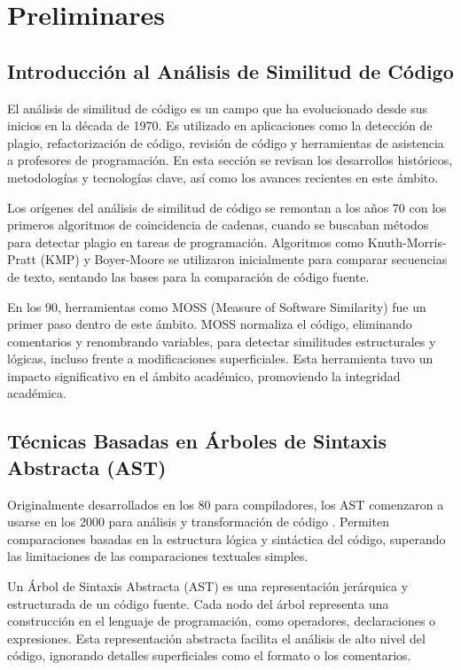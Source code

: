 \chapter{Preliminares}\label{chapter:state-of-the-art}

\section{Introducción al Análisis de Similitud de Código}
El análisis de similitud de código es un campo que ha evolucionado desde sus inicios en la década de 1970. Es utilizado en aplicaciones como la detección de plagio, refactorización de código, revisión de código y herramientas de asistencia a profesores de programación. En esta sección se revisan los desarrollos históricos, metodologías y tecnologías clave, así como los avances recientes en este ámbito.

Los orígenes del análisis de similitud de código se remontan a los años 70 con los primeros algoritmos de coincidencia de cadenas, cuando se buscaban métodos para detectar plagio en tareas de programación. Algoritmos como Knuth-Morris-Pratt (KMP) \cite{knuth1977fast} y Boyer-Moore \cite{boyer1977fast} se utilizaron inicialmente para comparar secuencias de texto, sentando las bases para la comparación de código fuente.

En los 90, herramientas como MOSS (Measure of Software Similarity) \cite{aiken1994moss} fue un primer paso dentro de este ámbito. MOSS normaliza el código, eliminando comentarios y renombrando variables, para detectar similitudes estructurales y lógicas, incluso frente a modificaciones superficiales. Esta herramienta tuvo un impacto significativo en el ámbito académico, promoviendo la integridad académica.

\section{Técnicas Basadas en Árboles de Sintaxis Abstracta (AST)}

Originalmente desarrollados en los 80 para compiladores, los AST comenzaron a usarse en los 2000 para análisis y transformación de código \cite{aho1986compilers}. Permiten comparaciones basadas en la estructura lógica y sintáctica del código, superando las limitaciones de las comparaciones textuales simples.

Un Árbol de Sintaxis Abstracta (AST) es una representación jerárquica y estructurada de un código fuente. Cada nodo del árbol representa una construcción en el lenguaje de programación, como operadores, declaraciones o expresiones. Esta representación abstracta facilita el análisis de alto nivel del código, ignorando detalles superficiales como el formato o los comentarios.

